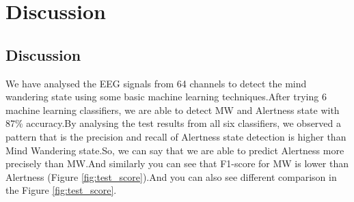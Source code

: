 
\chapter{Discussion} %

\label{Chapter6} %


\section{Discussion}

We have analysed the EEG signals from 64 channels to detect the mind wandering state using some basic machine learning techniques.After trying 6 machine learning classifiers, we are able to detect MW and Alertness state with 87\% accuracy.By analysing the test results from all six classifiers, we observed a pattern that is the precision and recall of  Alertness state detection is higher than  Mind Wandering state.So, we can say that we are able to predict Alertness more precisely than MW.And similarly you can see  that F1-score for MW is lower than Alertness (Figure \ref{fig:test_score}).And you can also see different comparison in the Figure \ref{fig:test_score}.


